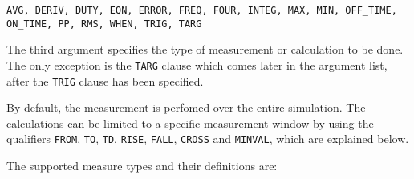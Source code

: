 \begin{Command}
\begin{Arguments}

\texttt{AVG, DERIV, DUTY, EQN, ERROR, FREQ, FOUR, INTEG, MAX, MIN, OFF\_TIME, ON\_TIME, PP, RMS, WHEN, TRIG, TARG}

The third argument specifies the type of measurement or calculation to
be done. The only exception is the {\tt TARG} clause which comes later
in the argument list, after the {\tt TRIG} clause has been specified.

By default, the measurement is perfomed over the entire
simulation.  The calculations can be limited to a specific measurement window by
using the qualifiers {\tt FROM}, {\tt TO}, {\tt TD}, {\tt RISE}, 
{\tt FALL}, {\tt CROSS} and {\tt MINVAL}, which are explained below. 

The supported measure types and their definitions are:


\end{Arguments}
\end{Command}
